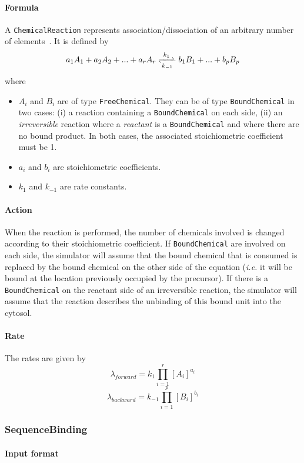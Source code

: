\paragraph{Formula} A \texttt{ChemicalReaction} represents association/dissociation of an arbitrary number of elements~. It is defined by
\[
	\reactionRev{a_1 A_1 + a_2 A_2 + ... + a_r A_r}{b_1 B_1 + ... + b_p B_p}{k_1}{k_{-1}}
\]
where
\begin{itemize}
\item $A_i$ and $B_i$ are of type \texttt{FreeChemical}. They can be of type \texttt{BoundChemical} in two cases: (i) a reaction containing a \texttt{BoundChemical} on each side, (ii) an \emph{irreversible} reaction where a \emph{reactant} is a \texttt{BoundChemical} and where there are no bound product. In both cases, the associated stoichiometric coefficient must be 1.
\item $a_i$ and $b_i$ are stoichiometric coefficients.
\item $k_1$ and $k_{-1}$ are rate constants.
\end{itemize}

\paragraph{Action} When the reaction is performed, the number of chemicals involved is changed according to their stoichiometric coefficient. If \texttt{BoundChemical} are involved on each side, the simulator will assume that the bound chemical that is consumed is replaced by the bound chemical on the other side of the equation (\textit{i.e.} it will be bound at the location previously occupied by the precursor). If there is a \texttt{BoundChemical} on the reactant side of an irreversible reaction, the simulator will assume that the reaction describes the unbinding of this bound unit into the cytosol.

\paragraph{Rate} The rates are given by
\[
\lambda_{forward} = k_1 \prod\limits_{i=1}^{r} [A_i]^{a_i}
\]
\[
\lambda_{backward} = k_{-1} \prod\limits_{i=1}^{p} [B_i]^{b_i}
\]

\subsubsection{SequenceBinding}
\paragraph{Input format}

